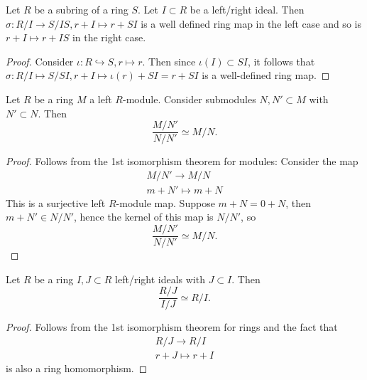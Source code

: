 \begin{proposition}
    Let $R$ be a subring of a ring $S$. Let $I\subset R$ be a left/right ideal. Then $\sigma : R/I \rightarrow S/IS, r+I \mapsto r+SI$ is a well defined ring map in the left case and so is $r+ I \mapsto r+IS$ in the right case.
\end{proposition}
\begin{proof}
    Consider $\iota : R \hookrightarrow S, r\mapsto r$. Then since $\iota(I)\subset SI$, it follows that $\sigma : R/I \mapsto S/SI, r + I \mapsto \iota(r)+SI=r+SI$ is a well-defined ring map.
\end{proof}
\begin{corollary}
    Let $R$ be a ring $M$ a left $R$-module. Consider submodules $N,N'\subset M$ with $N'\subset N$. Then 
    $$\frac{M/N'}{N/N'}\simeq M/N.$$
\end{corollary}
\begin{proof}
    Follows from the 1st isomorphism theorem for modules: Consider the map
    \begin{gather*}
        M/N' \rightarrow M/N\\
        m + N' \mapsto m+N
    \end{gather*}
    This is a surjective left $R$-module map. Suppose $m+N = 0+N$, then $m+N'\in N/N'$, hence the kernel of this map is $N/N'$, so
    $$
        \frac{M/N'}{N/N'}\simeq M/N.
    $$ 
\end{proof}
\begin{corollary}
    Let $R$ be a ring $I,J\subset R$ left/right ideals with $J\subset I$. Then 
    $$\frac{R/J}{I/J}\simeq R/I.$$
\end{corollary}
\begin{proof}
    Follows from the 1st isomorphism theorem for rings and the fact that 
    \begin{gather*}
        R/J \rightarrow R/I\\
        r+ J \mapsto r+I
    \end{gather*}
    is also a ring homomorphism. 
\end{proof}

